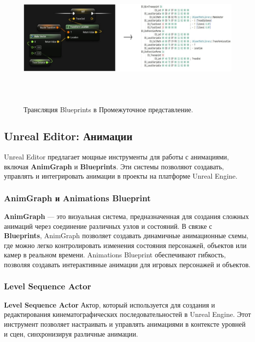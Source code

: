 \begin{figure}[H]
    \centering
    \includegraphics[height=7cm, width=13cm]{blueprints_ir.jpeg}
    \caption{Трансляция Blueprints в Промежуточное представление.}
\end{figure}

\subsection{Unreal Editor: Анимации}

Unreal Editor предлагает мощные инструменты для работы с анимациями, включая \textbf{AnimGraph} и \textbf{Blueprints}. Эти системы позволяют создавать, управлять и интегрировать анимации в проекты на платформе Unreal Engine.

\subsubsection{AnimGraph и Animations Blueprint}
\textbf{AnimGraph} — это визуальная система, предназначенная для создания сложных анимаций через соединение различных узлов и состояний. В связке с \textbf{Blueprints}, AnimGraph позволяет создавать динамичные анимационные схемы, где можно легко контролировать изменения состояния персонажей, объектов или камер в реальном времени. Animations Blueprint обеспечивают гибкость, позволяя создавать интерактивные анимации для игровых персонажей и объектов.

\subsubsection{Level Sequence Actor}
\textbf{Level Sequence Actor} Актор, который используется для создания и редактирования кинематографических последовательностей в Unreal Engine. Этот инструмент позволяет настраивать и управлять анимациями в контексте уровней и сцен, синхронизируя различные анимации.

